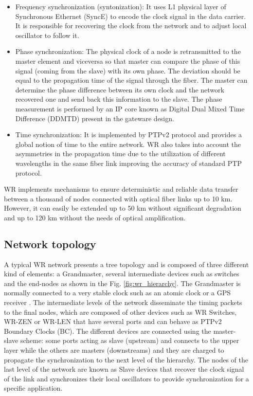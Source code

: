 \begin{itemize}
	\item {Frequency synchronization (syntonization): It uses L1 physical layer of Synchronous Ethernet (SyncE) to encode the clock signal in the data 
	carrier. It is responsible for recovering the clock from the network and to 
	adjust local oscillator to follow it.}
	\item {Phase synchronization: The physical clock of a node is retransmitted to the master element and viceversa so that master can compare the phase of this signal (coming from the slave) with its own phase. The deviation should be equal to the propagation time of the signal through the fiber. The master can determine the phase difference between its own clock and the network recovered one and send back this information to the slave. The phase measurement is performed by an IP core known as Digital Dual Mixed Time Difference (DDMTD) present in the gateware design.}
	\item {Time synchronization: It is implemented by PTPv2 protocol and provides a global notion of time to the entire network. WR also takes into account the asymmetries in the propagation time due to the utilization of different wavelengths in the same fiber link improving the accuracy of standard PTP protocol.}
\end{itemize}

WR implements mechanisms to ensure deterministic and reliable data transfer 
between a thousand of nodes connected with  optical fiber links up to 10 km. 
However, it can easily be extended up to 50 km without significant degradation 
and up to 120 km without the needs of optical amplification. 

\subsection{Network topology} 
\label{subsec:wr-net}

A typical WR network presents a tree topology and is composed of three different kind of elements: a Grandmaster, several intermediate devices such as switches and the end-nodes as shown in the Fig. \ref{fig:wr_hierarchy}. The Grandmaster is normally connected to a very stable clock such as an atomic clock or a GPS receiver \cite{Daniluk2012}. The intermediate levels of the network disseminate the timing packets to the final nodes, which are composed of other devices such as WR Switches, WR-ZEN or WR-LEN that have several ports and can behave as PTPv2 Boundary Clocks (BC). The different devices are connected using the master-slave scheme: some ports acting as slave (upstream) and connects to the upper layer while the others are masters (downstreams) and they are charged to propagate the synchronization to the next level of the hierarchy. The nodes of the last level of the network are known as Slave devices that recover the clock signal of the link and synchronizes their local oscillators to provide synchronization for a specific application.


